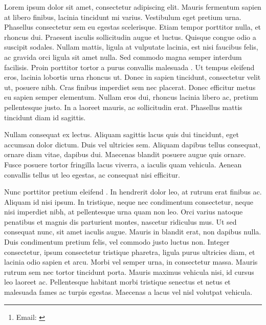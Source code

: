 \documentclass[11pt,twocolumn]{article}
\let\footnote=\endnote         %
\begin{document}
\title{\papertitle\footnote{This is a preprint of: \papercitation}}
\date{\paperdate}
\author[]{\myname \thanks{Email: \href{mailto:\myemail}{\myemail}}}
\affil[]{\myaffiliation}
\maketitle

Lorem\footnote{This is my footnote.} ipsum dolor sit amet, consectetur adipiscing elit. Mauris fermentum sapien at libero finibus, lacinia tincidunt mi varius. Vestibulum eget pretium urna. Phasellus consectetur sem eu egestas scelerisque. Etiam tempor porttitor nulla, et rhoncus dui. Praesent iaculis sollicitudin augue et luctus. Quisque congue odio a suscipit sodales. Nullam mattis, ligula at vulputate lacinia, est nisi faucibus felis, ac gravida orci ligula sit amet nulla. Sed commodo magna semper interdum facilisis. Proin porttitor tortor a purus convallis malesuada \citep{boeing_new_2017}. Ut tempus eleifend eros, lacinia lobortis urna rhoncus ut. Donec in sapien tincidunt, consectetur velit ut, posuere nibh. Cras finibus imperdiet sem nec placerat. Donec efficitur metus eu sapien semper elementum. Nullam eros dui, rhoncus lacinia libero ac, pretium pellentesque justo. In a laoreet mauris, ac sollicitudin erat. Phasellus mattis tincidunt diam id sagittis.

Nullam consequat ex lectus. Aliquam sagittis lacus quis dui tincidunt, eget accumsan dolor dictum. Duis vel ultricies sem. Aliquam dapibus tellus consequat, ornare diam vitae, dapibus dui. Maecenas blandit posuere augue quis ornare. Fusce posuere tortor fringilla lacus viverra, a iaculis quam vehicula. Aenean convallis tellus ut leo egestas, ac consequat nisi efficitur.

Nunc porttitor pretium eleifend \citep{boarnet_travel_2001}. In hendrerit dolor leo, at rutrum erat finibus ac. Aliquam id nisi ipsum. In tristique, neque nec condimentum consectetur, neque nisi imperdiet nibh, at pellentesque urna quam non leo. Orci varius natoque penatibus et magnis dis parturient montes, nascetur ridiculus mus. Ut sed consequat nunc, sit amet iaculis augue. Mauris in blandit erat, non dapibus nulla. Duis condimentum pretium felis, vel commodo justo luctus non. Integer consectetur, ipsum consectetur tristique pharetra, ligula purus ultricies diam, et lacinia odio sapien et arcu. Morbi vel semper urna, in consectetur massa. Mauris rutrum sem nec tortor tincidunt porta. Mauris maximus vehicula nisi, id cursus leo laoreet ac. Pellentesque habitant morbi tristique senectus et netus et malesuada fames ac turpis egestas. Maecenas a lacus vel nisl volutpat vehicula.
\end{document}
